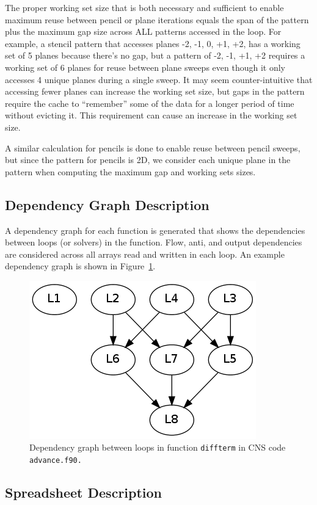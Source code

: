 \documentclass{article}
\begin{document}
The proper working set size that is both necessary and sufficient to
enable maximum reuse between pencil or plane iterations equals the span
of the pattern plus the maximum gap size across ALL patterns accessed
in the loop.  For example, a stencil pattern that accesses planes -2,
-1, 0, +1, +2, has a working set of 5 planes because there's no gap,
but a pattern of -2, -1, +1, +2 requires a working set of 6 planes for
reuse between plane sweeps even though it only accesses 4 unique planes
during a single sweep.  It may seem counter-intuitive that accessing
fewer planes can increase the working set size, but gaps in the pattern
require the cache to ``remember'' some of the data for a longer period
of time without evicting it.  This requirement can cause an increase in
the working set size.

A similar calculation for pencils is done to enable reuse between
pencil sweeps, but since the pattern for pencils is 2D, we consider each
unique plane in the pattern when computing the maximum gap and working
sets sizes.

\subsection{Dependency Graph Description}

A dependency graph for each function is generated that shows the
dependencies between loops (or solvers) in the function.  Flow,
anti, and output dependencies are considered across all arrays read
and written in each loop.  An example dependency graph is shown in
Figure~\ref{fig:depGraph}.

\begin{figure}
\begin{center}
\includegraphics[width=.5\textwidth]{figs/diffterm.png}
\caption{Dependency graph between loops in function {\tt diffterm}
in CNS code {\tt advance.f90.}}
\label{fig:depGraph}
\end{center}
\end{figure}

\subsection{Spreadsheet Description}
\end{document}
